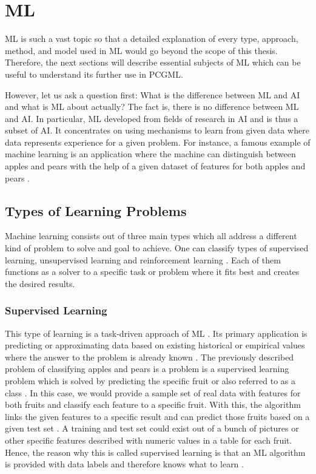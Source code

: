 \documentclass[MGS,Master,english]{twbook}%
\begin{document}
\chapter{\acl{ML}} \label{chapter::machineLearning}
\ac{ML} is such a vast topic so that a detailed explanation of every type, approach, method, and model used in ML would go beyond the scope of this thesis. Therefore, the next sections will describe essential subjects of ML which can be useful to understand its further use in PCGML. 

However, let us ask a question first: What is the difference between ML and AI and what is ML about actually? The fact is, there is no difference between ML and AI. In particular, ML developed from fields of research in AI and is thus a subset of AI. It concentrates on using mechanisms to learn from given data where data represents experience for a given problem. For instance, a famous example of machine learning is an application where the machine can distinguish between apples and pears with the help of a given dataset of features for both apples and pears \cite{ai::book}. 

\section{Types of Learning Problems}
Machine learning consists out of three main types which all address a different kind of problem to solve and goal to achieve. One can classify types of supervised learning, unsupervised learning and reinforcement learning \cite{ml::book::developer}. Each of them functions as a solver to a specific task or problem where it fits best and creates the desired results.

\subsection{Supervised Learning}
This type of learning is a task-driven approach of ML \cite{ml::book::developer}. Its primary application is predicting or approximating data based on existing historical or empirical values where the answer to the problem is already known \cite{ai::book}. The previously described problem of classifying apples and pears is a problem is a supervised learning problem which is solved by predicting the specific fruit or also referred to as a class \cite{ml::book::developer}. In this case, we would provide a sample set of real data with features for both fruits and classify each feature to a specific fruit. With this, the algorithm links the given features to a specific result and can predict those fruits based on a given test set \cite{ml::book::developer}. A training and test set could exist out of a bunch of pictures or other specific features described with numeric values in a table for each fruit. Hence, the reason why this is called supervised learning is that an ML algorithm is provided with data labels and therefore knows what to learn \cite{ai::book}.
\end{document}
